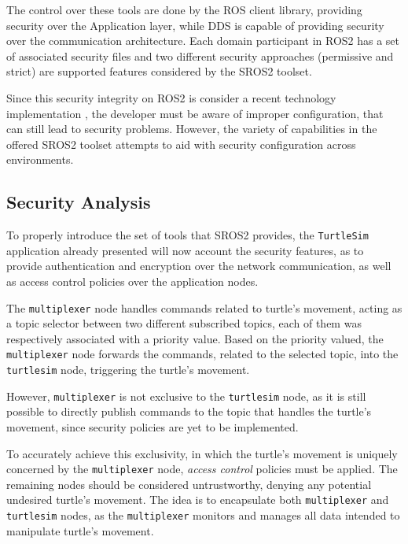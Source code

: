 The control over these tools are done by the ROS client library, providing security over the Application layer, while DDS is capable of providing security over the communication architecture. Each domain participant in ROS2 has a set of associated security files and two different security approaches (permissive and strict) are supported features considered by the SROS2 toolset.

Since this security integrity on ROS2 is consider a recent technology implementation \cite{ros-dds-integration}, the developer must be aware of improper configuration, that can still lead to security problems. However, the variety of capabilities in the offered SROS2 toolset attempts to aid with security configuration across environments. 

\subsection{Security Analysis}

To properly introduce the set of tools that SROS2 provides, the \texttt{TurtleSim} application already presented will now account the security features, as to provide authentication and encryption over the network communication, as well as access control policies over the application nodes. 
            
The \texttt{multiplexer} node handles commands related to turtle's movement, acting as a topic selector between two different subscribed topics, each of them was respectively associated with a priority value. Based on the priority valued, the \texttt{multiplexer} node forwards the commands, related to the selected topic, into the \texttt{turtlesim} node, triggering the turtle's movement. 

However, \texttt{multiplexer} is not exclusive to the \texttt{turtlesim} node, as it is still possible to directly publish commands to the topic that handles the turtle's movement, since security policies are yet to be implemented.

To accurately achieve this exclusivity, in which the turtle's movement is uniquely concerned by the \texttt{multiplexer} node, \textit{access control} policies must be applied. The remaining nodes should be considered untrustworthy, denying any potential undesired turtle's movement. The idea is to encapsulate both \texttt{multiplexer} and \texttt{turtlesim} nodes, as the \texttt{multiplexer} monitors and manages all data intended to manipulate turtle's movement.


